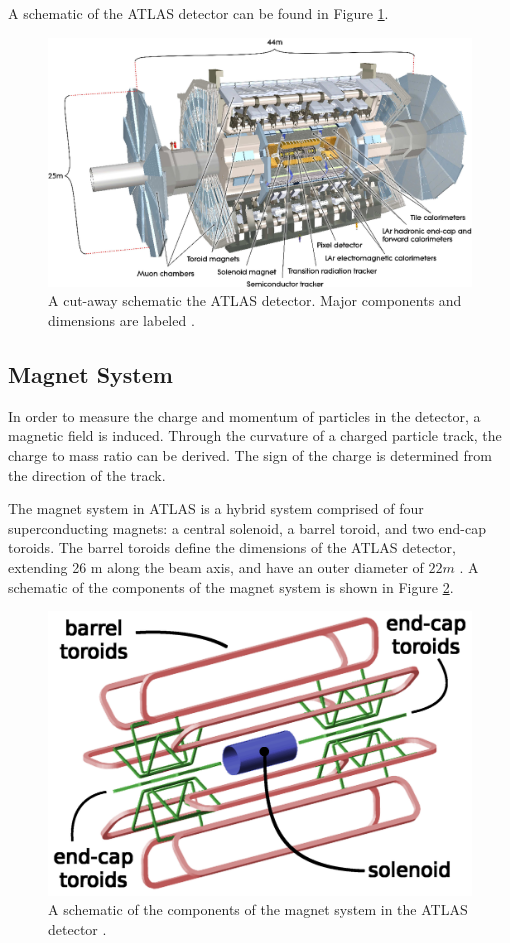 A schematic of the ATLAS detector can be found in Figure \ref{fig:atlas}.

\begin{figure}[!ht]
    \centering
    \includegraphics[width=.7\textwidth]{chapters/chapter2_experiment/images/atlas_detector.png}
    \caption{A cut-away schematic the ATLAS detector. Major components and dimensions are labeled \cite{atlas-experiment}.}
    \label{fig:atlas}
\end{figure}

\subsection{Magnet System} \label{ssec:magnetsystem}
In order to measure the charge and momentum of particles in the detector, a magnetic field is induced. Through the curvature of a charged particle track, the charge to mass ratio can be derived. The sign of the charge is determined from the direction of the track.

The magnet system in ATLAS is a hybrid system comprised of four superconducting magnets: a central solenoid, a barrel toroid, and two end-cap toroids. The barrel toroids define the dimensions of the ATLAS detector, extending 26 m along the beam axis, and have an outer diameter of $\unit{22}{m}$ \cite{magnet-system-tdr}. A schematic of the components of the magnet system is shown in Figure \ref{fig:magnetSystem}.

\begin{figure}[!ht]
    \centering
    \includegraphics[width=.8\textwidth]{chapters/chapter2_experiment/images/magnetSystems.png}
    \caption{A schematic of the components of the magnet system in the ATLAS detector \cite{magnet-schematic}.}
    \label{fig:magnetSystem}
\end{figure}

